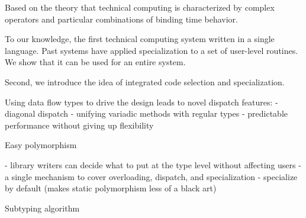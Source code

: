 Based on the theory that technical computing is characterized by complex
operators and particular combinations of binding time behavior.


To our knowledge, the first technical computing system written in a single language.
Past systems have applied specialization to a set of user-level routines.
We show that it can be used for an entire system.



Second, we introduce the idea of integrated code selection and specialization.

Using data flow types to drive the design leads to novel dispatch features:
- diagonal dispatch
- unifying variadic methods with regular types
- predictable performance without giving up flexibility






Easy polymorphism

- library writers can decide what to put at the type level without affecting users
- a single mechanism to cover overloading, dispatch, and specialization
- specialize by default (makes static polymorphism less of a black art)



Subtyping algorithm



